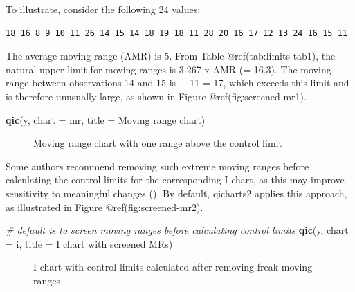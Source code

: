 \documentclass[
]{book}
\makeatletter
\newenvironment{Shaded}{\begin{snugshade}}{\end{snugshade}}
\newcommand{\AttributeTok}[1]{\textcolor[rgb]{0.13,0.29,0.53}{#1}}
\newcommand{\CommentTok}[1]{\textcolor[rgb]{0.56,0.35,0.01}{\textit{#1}}}
\newcommand{\FunctionTok}[1]{\textcolor[rgb]{0.13,0.29,0.53}{\textbf{#1}}}
\newcommand{\NormalTok}[1]{#1}
\newcommand{\StringTok}[1]{\textcolor[rgb]{0.31,0.60,0.02}{#1}}
\newcommand*\pandocbounded[1]{%
  \sbox\pandoc@box{#1}%
  \Gscale@div\@tempa{\textheight}{\dimexpr\ht\pandoc@box+\dp\pandoc@box\relax}%
  \Gscale@div\@tempb{\linewidth}{\wd\pandoc@box}%
  \ifdim\@tempb\p@<\@tempa\p@\let\@tempa\@tempb\fi%
  \ifdim\@tempa\p@<\p@\scalebox{\@tempa}{\usebox\pandoc@box}%
  \else\usebox{\pandoc@box}%
  \fi%
}
\makeatother
\begin{document}
To illustrate, consider the following 24 values:

\begin{verbatim}
18 16 8 9 10 11 26 14 15 14 18 19 18 11 28 20 16 17 12 13 24 16 15 11
\end{verbatim}

The average moving range (AMR) is 5. From Table @ref(tab:limits-tab1),
the natural upper limit for moving ranges is 3.267 x AMR (= 16.3). The
moving range between observations 14 and 15 is  − 11\textbar{}
= 17, which exceeds this limit and is therefore unusually large, as
shown in Figure @ref(fig:screened-mr1).

\begin{Shaded}
\begin{Highlighting}[]
\FunctionTok{qic}\NormalTok{(y, }
    \AttributeTok{chart =} \StringTok{\textquotesingle{}mr\textquotesingle{}}\NormalTok{, }
    \AttributeTok{title =} \StringTok{\textquotesingle{}Moving range chart\textquotesingle{}}\NormalTok{)}
\end{Highlighting}
\end{Shaded}

\begin{figure}
\centering
\pandocbounded{}
\caption{Moving range chart with one range above the control limit}
\end{figure}

Some authors recommend removing such extreme moving ranges before
calculating the control limits for the corresponding I chart, as this
may improve sensitivity to meaningful changes
(). By default, qicharts2 applies
this approach, as illustrated in Figure @ref(fig:screened-mr2).

\begin{Shaded}
\begin{Highlighting}[]
\CommentTok{\# default is to screen moving ranges before calculating control limits}
\FunctionTok{qic}\NormalTok{(y, }
    \AttributeTok{chart =} \StringTok{\textquotesingle{}i\textquotesingle{}}\NormalTok{, }
    \AttributeTok{title =} \StringTok{\textquotesingle{}I chart with screened MRs\textquotesingle{}}\NormalTok{)}
\end{Highlighting}
\end{Shaded}

\begin{figure}
\centering
\pandocbounded{}
\caption{I chart with control limits calculated after removing freak
moving ranges}
\end{figure}
\end{document}
